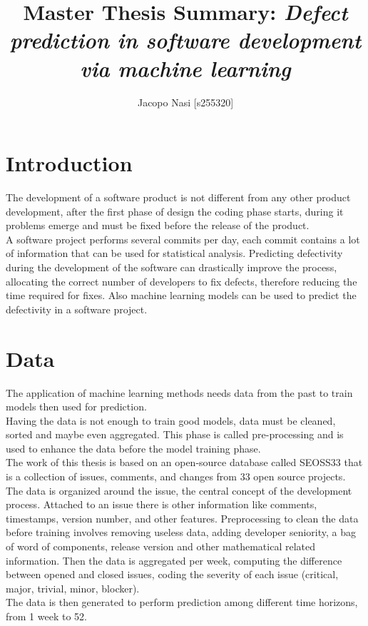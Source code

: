 \documentclass{article}
\begin{document}
\title{Master Thesis Summary: \textit{Defect prediction in software development via machine learning}}

\author{Jacopo Nasi [s255320]}

\maketitle

\section{Introduction}
The development of a software product is not different from any other product development, after the first phase of design the coding phase starts, during it problems emerge and must be fixed before the release of the product.\\
A software project performs several commits per day, each commit contains a lot of information that can be used for statistical analysis. Predicting defectivity during the development of the software can drastically improve the process, allocating the correct number of developers to fix defects, therefore reducing the time required for fixes. Also machine learning models can be used to predict the defectivity in a software project.

\section{Data}
The application of machine learning methods needs data from the past to train models then used for prediction.\\
Having the data is not enough to train good models, data must be cleaned, sorted and maybe even aggregated. This phase is called pre-processing and is used to enhance the data before the model training phase.\\
The work of this thesis is based on an open-source database called SEOSS33 that is a collection of issues, comments, and changes from  33 open source projects. The data is organized around the issue, the central concept of the development process. Attached to an issue there is other information like comments, timestamps, version number, and other features. 
Preprocessing to clean the data before training involves removing useless data, adding developer seniority, a bag of word of components, release version and other mathematical related information. Then the data is aggregated per week, computing the difference between opened and closed issues, coding the severity of each issue (critical, major, trivial, minor, blocker).\\
The data is then generated to perform prediction among different time horizons, from 1 week to 52.
\end{document}
